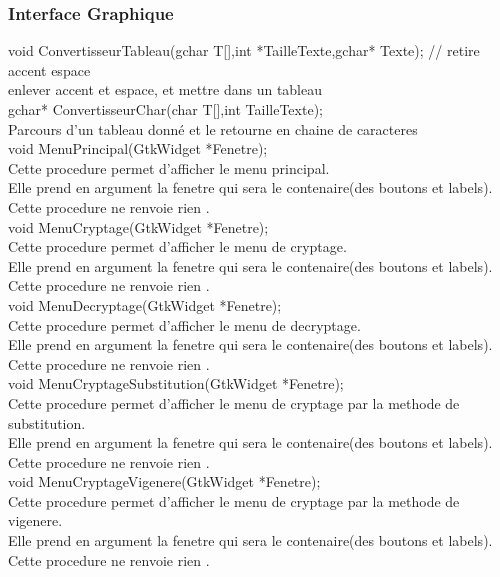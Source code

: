 \documentclass[a4]{article}
\begin{document}
		\subsubsection{Interface Graphique}
	void ConvertisseurTableau(gchar T[],int *TailleTexte,gchar* Texte); // retire accent espace\\
		enlever accent et espace, et mettre dans un tableau\\
	 
	gchar* ConvertisseurChar(char T[],int TailleTexte); \\
		Parcours d'un tableau donné et le retourne en chaine de caracteres\\
		
	void MenuPrincipal(GtkWidget *Fenetre);\\
		Cette procedure permet d'afficher le menu principal.\\
		Elle prend en argument la fenetre qui sera le contenaire(des boutons et labels).\\
		Cette procedure ne renvoie rien .\\
	
	void MenuCryptage(GtkWidget *Fenetre);\\
		Cette procedure permet d'afficher le menu de cryptage.\\
		Elle prend en argument la fenetre qui sera le contenaire(des boutons et labels).\\
		Cette procedure ne renvoie rien .\\
	
	void MenuDecryptage(GtkWidget *Fenetre);\\
		Cette procedure permet d'afficher le menu de decryptage.\\
		Elle prend en argument la fenetre qui sera le contenaire(des boutons et labels).\\
		Cette procedure ne renvoie rien .\\
	
	void MenuCryptageSubstitution(GtkWidget *Fenetre);\\
		Cette procedure permet d'afficher le menu de cryptage par la methode de substitution.\\
		Elle prend en argument la fenetre qui sera le contenaire(des boutons et labels).\\
		Cette procedure ne renvoie rien .\\
	
	void MenuCryptageVigenere(GtkWidget *Fenetre);\\
		Cette procedure permet d'afficher le menu de cryptage par la methode de vigenere.\\
		Elle prend en argument la fenetre qui sera le contenaire(des boutons et labels).\\
		Cette procedure ne renvoie rien .\\
	
\end{document}
